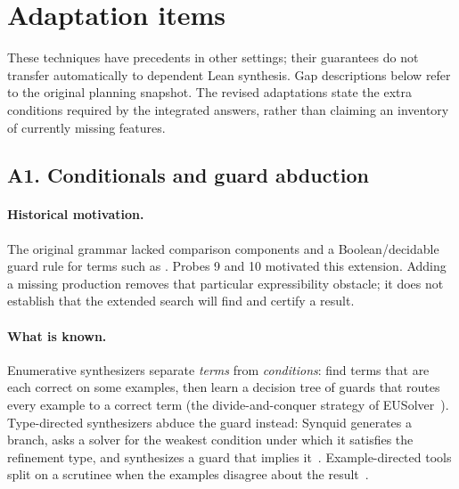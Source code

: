\section{Adaptation items}\label{sec:adaptation}

These techniques have precedents in other settings; their guarantees do not
transfer automatically to dependent Lean synthesis. Gap descriptions below
refer to the original  planning snapshot. The revised adaptations
state the extra conditions required by the integrated answers, rather than
claiming an inventory of currently missing features.

\subsection{A1. Conditionals and guard abduction}

\paragraph{Historical motivation.} The original grammar lacked comparison
components and a Boolean/decidable guard rule for terms such as
. Probes 9 and 10 motivated this extension.
Adding a missing production removes that particular expressibility obstacle;
it does not establish that the extended search will find and certify a result.

\paragraph{What is known.} Enumerative synthesizers separate \emph{terms} from \emph{conditions}: find terms that are each correct on some examples, then learn a decision tree of guards that routes every example to a correct term (the divide-and-conquer strategy of EUSolver~\cite{eusolver}). Type-directed synthesizers abduce the guard instead: Synquid generates a branch, asks a solver for the weakest condition under which it satisfies the refinement type, and synthesizes a guard that implies it~\cite{synquid}. Example-directed tools split on a scrutinee when the examples disagree about the result~\cite{myth}.

